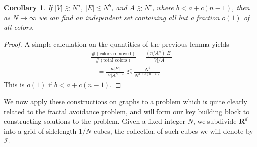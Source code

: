 \documentclass{article}
\theoremstyle{plain}
\newtheorem*{corollary}{Corollary}
\theoremstyle{plain}
\begin{document}
\begin{multicols}{2}
\begin{corollary}
	If $|V| \gtrsim N^a$, $|E| \lesssim N^b$, and $A \gtrsim N^c$, where $b < a + c(n-1)$, then as $N \to \infty$ we can find an independent set containing all but a fraction $o(1)$ of all colors.
\end{corollary}
\begin{proof}
	A simple calculation on the quantities of the previous lemma yields
	\begin{align*}
		&\frac{\# ( \text{colors removed} )}{\# ( \text{total colors} )} = \frac{(n/A^n)|E|}{|V|/A}\\
		&\ \ \ \ = \frac{n|E|}{|V|A^{n-1}} \lesssim \frac{N^b}{N^{a + c(n-1)}}
	\end{align*}
	This is $o(1)$ if $b < a + c(n-1)$.
\end{proof}

We now apply these constructions on graphs to a problem which is quite clearly related to the fractal avoidance problem, and will form our key building block to constructing solutions to the problem. Given a fixed integer $N$, we subdivide $\mathbf{R}^d$ into a grid of sidelength $1/N$ cubes, the collection of such cubes we will denote by $\mathcal{I}$.


\end{multicols}
\end{document}
